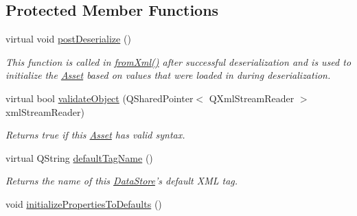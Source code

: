 \subsection*{Protected Member Functions}
\begin{DoxyCompactItemize}
\item 
virtual void \hyperlink{class_picto_1_1_data_store_aaa194a5392d79cefe701c163564efd52}{post\-Deserialize} ()
\begin{DoxyCompactList}\small\item\em This function is called in \hyperlink{class_picto_1_1_asset_a8bed4da09ecb1c07ce0dab313a9aba67}{from\-Xml()} after successful deserialization and is used to initialize the \hyperlink{class_picto_1_1_asset}{Asset} based on values that were loaded in during deserialization. \end{DoxyCompactList}\item 
virtual bool \hyperlink{class_picto_1_1_data_store_a077c9284e2d18d50b72e0fea1a5eeacb}{validate\-Object} (Q\-Shared\-Pointer$<$ Q\-Xml\-Stream\-Reader $>$ xml\-Stream\-Reader)
\begin{DoxyCompactList}\small\item\em Returns true if this \hyperlink{class_picto_1_1_asset}{Asset} has valid syntax. \end{DoxyCompactList}\item 
virtual Q\-String \hyperlink{class_picto_1_1_data_store_a773e96bb8df73a90d56c1aa8fdc0dfa5}{default\-Tag\-Name} ()
\begin{DoxyCompactList}\small\item\em Returns the name of this \hyperlink{class_picto_1_1_data_store}{Data\-Store}'s default X\-M\-L tag. \end{DoxyCompactList}\item 
\hypertarget{class_picto_1_1_data_store_a5876fddb6f37afd350faed293f549f64}{void \hyperlink{class_picto_1_1_data_store_a5876fddb6f37afd350faed293f549f64}{initialize\-Properties\-To\-Defaults} ()}\label{class_picto_1_1_data_store_a5876fddb6f37afd350faed293f549f64}


\end{DoxyCompactItemize}

